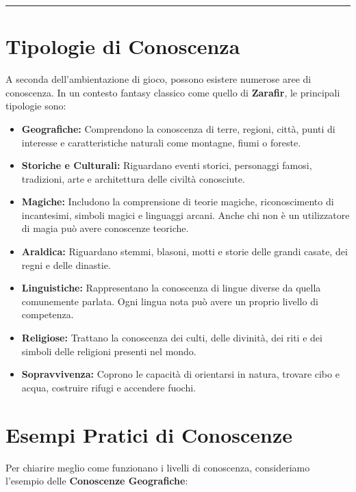 \documentclass[../manuale_main.tex]{subfiles}
\begin{document}
\vspace{0.5cm}
\noindent
\begin{center}
\rule{\textwidth}{0.4pt} 
\end{center}
\vspace{0.5cm}

\section{Tipologie di Conoscenza}
A seconda dell’ambientazione di gioco, possono esistere numerose aree di conoscenza. In un contesto fantasy classico come quello di \textbf{Zarafir}, le principali tipologie sono:

\begin{itemize}
    \item \textbf{Geografiche:} Comprendono la conoscenza di terre, regioni, città, punti di interesse e caratteristiche naturali come montagne, fiumi o foreste.
    
    \item \textbf{Storiche e Culturali:} Riguardano eventi storici, personaggi famosi, tradizioni, arte e architettura delle civiltà conosciute.
    
    \item \textbf{Magiche:} Includono la comprensione di teorie magiche, riconoscimento di incantesimi, simboli magici e linguaggi arcani. Anche chi non è un utilizzatore di magia può avere conoscenze teoriche.
    
    \item \textbf{Araldica:} Riguardano stemmi, blasoni, motti e storie delle grandi casate, dei regni e delle dinastie.
    
    \item \textbf{Linguistiche:} Rappresentano la conoscenza di lingue diverse da quella comunemente parlata. Ogni lingua nota può avere un proprio livello di competenza.
    
    \item \textbf{Religiose:} Trattano la conoscenza dei culti, delle divinità, dei riti e dei simboli delle religioni presenti nel mondo.
    
    \item \textbf{Sopravvivenza:} Coprono le capacità di orientarsi in natura, trovare cibo e acqua, costruire rifugi e accendere fuochi.
\end{itemize}

\vspace{0.3cm}

\section{Esempi Pratici di Conoscenze}
Per chiarire meglio come funzionano i livelli di conoscenza, consideriamo l’esempio delle \textbf{Conoscenze Geografiche}:
\end{document}
